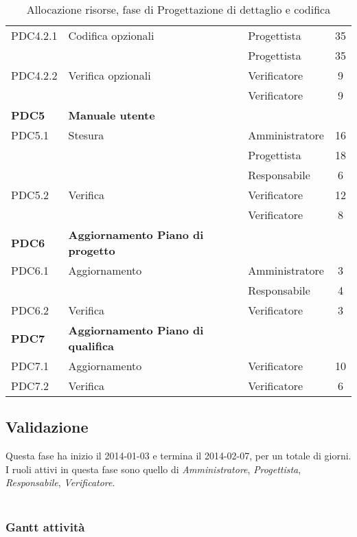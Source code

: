 \begin{table}[H]
\begin{tabular}{ l l l c  }
	\cline{3-4}
	PDC4.2.1 & Codifica opzionali & Progettista & 35\\ 
    & & Progettista & 35\\
	\cline{3-4}
	PDC4.2.2 & Verifica opzionali & Verificatore & 9\\	
	& & Verificatore & 9\\
	\hline
	\textbf{PDC5} & \textbf{Manuale utente} \\
	\cline{3-4}
	PDC5.1 & Stesura  & Amministratore & 16\\ 
	 & & Progettista & 18\\
	 & & Responsabile & 6\\
    \cline{3-4}
	PDC5.2 & Verifica & Verificatore &  12\\
	& & Verificatore & 8\\
	\hline
	\textbf{PDC6} & \textbf{Aggiornamento Piano di progetto} \\
	\cline{3-4}
	PDC6.1 & Aggiornamento  & Amministratore & 3\\ 
	 & & Responsabile & 4\\
    \cline{3-4}
	PDC6.2 & Verifica & Verificatore &  3\\
	\hline
	\textbf{PDC7} & \textbf{Aggiornamento Piano di qualifica} \\
	\cline{3-4}
	PDC7.1 & Aggiornamento  & Verificatore & 10\\ 
    \cline{3-4}
	PDC7.2 & Verifica & Verificatore &  6\\
	\hline
	\end{tabular}
	\caption{Allocazione risorse, fase di Progettazione di dettaglio e codifica}
	\end{table}	
	
	
	\subsection{Validazione}
	
Questa fase ha inizio il 2014-01-03 e termina il 2014-02-07, per un totale di   giorni. \\
I ruoli attivi in questa fase sono quello di \textit{Amministratore}, \textit{Progettista}, \textit{Responsabile}, \textit{Verificatore}. \\ \\

\subsubsection{Gantt attività}

